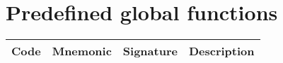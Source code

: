 \section{Predefined global functions}
\label{sec:appendix:primops}

    \tiny
    \begin{longtable}[h]{|l |l | p{.25\linewidth} | p{.5\linewidth} |}
	\hline
Code &   Mnemonic   &  Signature & Description \\
    \hline
    

    \end{longtable}
    \normalsize




